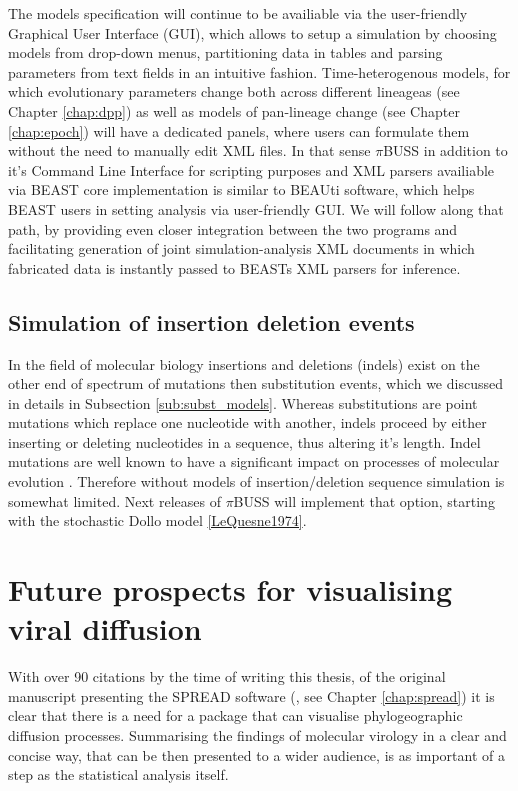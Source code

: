 The models specification will continue to be availiable via the user-friendly Graphical User Interface (GUI), which allows to setup a simulation by choosing models from drop-down menus, partitioning data in tables and parsing parameters from text fields in an intuitive fashion.
Time-heterogenous models, for which evolutionary parameters change both across different lineageas (see Chapter \ref{chap:dpp}) as well as models of pan-lineage change (see Chapter \ref{chap:epoch}) will have a dedicated panels, where users can formulate them without the need to manually edit XML files.
In that sense $\pi$BUSS in addition to it's Command Line Interface for scripting purposes and XML parsers availiable via BEAST core implementation is similar to BEAUti software, which helps BEAST users in setting analysis via user-friendly GUI.
We will follow along that path, by providing even closer integration between the two programs and facilitating generation of joint simulation-analysis XML documents in which fabricated data is instantly passed to BEASTs XML parsers for inference.

\subsection{Simulation of insertion deletion events}

In the field of molecular biology insertions and deletions (indels) exist on the other end of spectrum of mutations then substitution events, which we discussed in details in Subsection \ref{sub:subst_models}.
Whereas substitutions are point mutations which replace one nucleotide with another, indels proceed by either inserting or deleting nucleotides in a sequence, thus altering it's length. 
Indel mutations are well known to have a significant impact on processes of molecular evolution \citep{Fletcher2009}.
Therefore without models of insertion/deletion sequence simulation is somewhat limited.
Next releases of $\pi$BUSS will implement that option, starting with the stochastic Dollo model \ref{LeQuesne1974}.

\section{Future prospects for visualising viral diffusion}

With over 90 citations by the time of writing this thesis, of the original manuscript presenting the SPREAD software (\citet{Bielejec2011}, see Chapter \ref{chap:spread}) it is clear that there is a need for a package that can visualise phylogeographic diffusion processes.
Summarising the findings of molecular virology in a clear and concise way, that can be then presented to a wider audience, is as important of a step as the statistical analysis itself.

